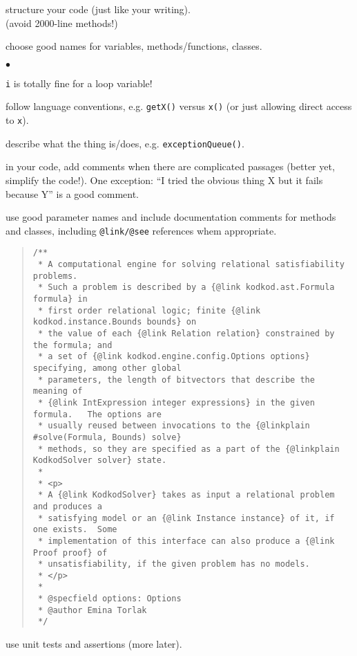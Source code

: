 \documentclass[11pt]{article}
\newcommand{\squishlist}{
 \begin{list}{$\bullet$}
  { \setlength{\itemsep}{0pt}
     \setlength{\parsep}{3pt}
     \setlength{\topsep}{3pt}
     \setlength{\partopsep}{0pt}
     \setlength{\leftmargin}{1.5em}
     \setlength{\labelwidth}{1em}
     \setlength{\labelsep}{0.5em} } }
\newcommand{\squishend}{
  \end{list}  }
\begin{document}
\begin{enumerate}
\item structure your code (just like your writing).\\
(avoid 2000-line methods!)
\item choose good names for variables, methods/functions, classes.
\squishlist
\item {\tt i} is totally fine for a loop variable!
\item follow language conventions, e.g. {\tt getX()} versus {\tt x()} (or just allowing direct access to {\tt x}).
\item describe what the thing is/does, e.g. {\tt exceptionQueue()}.
\squishend
\item in your code, add comments when there are complicated passages (better yet, simplify the code!). One exception: ``I tried the obvious thing X but it fails because Y'' is a good comment.
\item use good parameter names and include documentation comments for methods and classes, including \verb+@link/@see+ references whem appropriate.
{\small 
\begin{quote}
\begin{verbatim}
/** 
 * A computational engine for solving relational satisfiability problems. 
 * Such a problem is described by a {@link kodkod.ast.Formula formula} in 
 * first order relational logic; finite {@link kodkod.instance.Bounds bounds} on 
 * the value of each {@link Relation relation} constrained by the formula; and 
 * a set of {@link kodkod.engine.config.Options options} specifying, among other global 
 * parameters, the length of bitvectors that describe the meaning of 
 * {@link IntExpression integer expressions} in the given formula.   The options are 
 * usually reused between invocations to the {@linkplain #solve(Formula, Bounds) solve}
 * methods, so they are specified as a part of the {@linkplain KodkodSolver solver} state. 
 * 
 * <p>
 * A {@link KodkodSolver} takes as input a relational problem and produces a 
 * satisfying model or an {@link Instance instance} of it, if one exists.  Some 
 * implementation of this interface can also produce a {@link Proof proof} of 
 * unsatisfiability, if the given problem has no models.
 * </p>
 * 
 * @specfield options: Options 
 * @author Emina Torlak 
 */
\end{verbatim}
\end{quote}
}
\item use unit tests and assertions (more later).
\end{enumerate}
\end{document}
